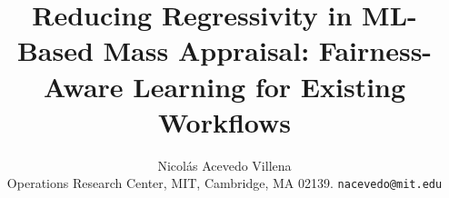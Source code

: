\documentclass[12pt, draft]{article}
\title{\vspace{-5mm}Reducing Regressivity in ML-Based Mass Appraisal: Fairness-Aware Learning for Existing Workflows\vspace{0mm}}
\author{Nicolás Acevedo Villena\\
{\small Operations Research Center, MIT, Cambridge, MA 02139. \texttt{nacevedo@mit.edu}}}
\date{
\vspace{-8mm}
}
\theoremstyle{plain}
\theoremstyle{definition}
\newcommand{\1}{\mathbf{1}}
\begin{document}
\maketitle

\begin{abstract}



\end{abstract}
\end{document}
